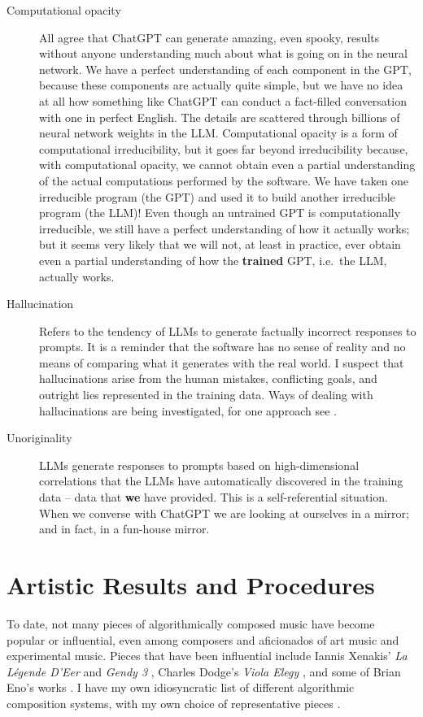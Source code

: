 \documentclass[11pt]{scrartcl}
\begin{document}
\begin{description}
\item[Computational opacity] All agree that ChatGPT can generate amazing, even spooky, results without anyone understanding much about what is going on in the neural network. We have a perfect understanding of each component in the GPT, because these components are actually quite simple, but we have no idea at all how something like ChatGPT can conduct a fact-filled conversation with one in perfect English. The details are scattered through billions of neural network weights in the LLM. Computational opacity is a form of computational irreducibility, but it goes far beyond irreducibility because, with computational opacity, we cannot obtain even a partial understanding of the actual computations performed by the software. We have taken one irreducible program (the GPT) and used it to build another irreducible program (the LLM)! Even though an untrained GPT is computationally irreducible, we still have a perfect understanding of how it actually works; but it seems very likely that we will not, at least in practice, ever obtain even a partial understanding of how the  \textbf{trained} GPT, i.e.\ the LLM, actually works.
\item [Hallucination] Refers to the tendency of LLMs to generate factually incorrect responses to prompts. It is a reminder that the software has no sense of reality and no means of comparing what it generates with the real world. I suspect that hallucinations arise from the human mistakes, conflicting goals, and outright lies represented in the training data. Ways of dealing with hallucinations are being investigated, for one approach see \parencite{christiano2017deep}.
\item [Unoriginality] LLMs generate responses to prompts based on high-dimensional correlations that the LLMs have automatically discovered in the training data -- data that \textbf{we} have provided. This is a self-referential situation. When we converse with ChatGPT we are looking at ourselves in a mirror; and in fact, in a fun-house mirror.
\end{description}

\section*{Artistic Results and Procedures}

To date, not many pieces of algorithmically composed music have become popular or influential, even among composers and aficionados of art music and experimental music. Pieces that have been influential include Iannis Xenakis' \emph{La Légende D'Eer} \parencite{Solr-8143160} and \emph{Gendy 3} \parencite{gendy3},  Charles Dodge's \emph{Viola Elegy} \parencite{violaelegy}, and some of Brian Eno's works \parencite{eno1996generative, enochilvers}. I have my own idiosyncratic list of different algorithmic composition systems, with my own choice of representative pieces \parencite{rant}.
\end{document}
